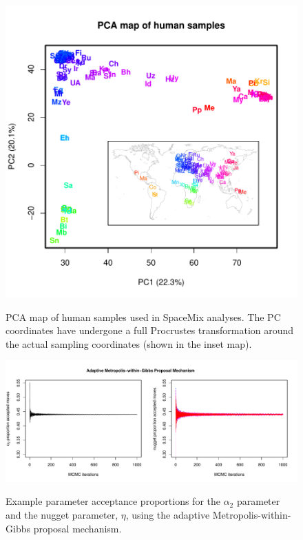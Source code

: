 \documentclass[10pt,letterpaper]{article}
\begin{document}
\begin{figure}
	\centering
		{\includegraphics[width=\textwidth]{../figs/globetrotter/globe_PCA_map.pdf}}
	\caption{PCA map of human samples used in SpaceMix analyses.  The PC coordinates have undergone a full Procrustes transformation around the actual sampling coordinates (shown in the inset map).}
\label{sfig:globe_PCA_map}
\end{figure}

\clearpage

\begin{figure}
	\centering
		{\includegraphics[width=\textwidth]{../figs/sims/example_acceptance_rates.pdf}}
	\caption{Example parameter acceptance proportions for the $\alpha_2$ parameter and the nugget parameter, $\eta$, using the adaptive Metropolis-within-Gibbs proposal mechanism.}\label{sfig:example_acceptance_rates}
\end{figure}
\end{document}
